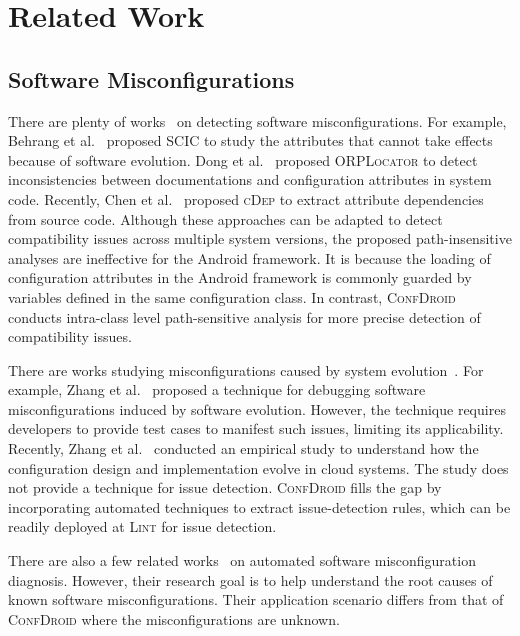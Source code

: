 \section{Related Work}

\subsection{Software Misconfigurations}
There are plenty of works~\cite{rabkin2011static, xu2013not
,behrang2015users,xu2016early, dong2016orplocator, chen2020understanding,
toman2016staccato} on detecting software misconfigurations.
For example,
Behrang et al.~\cite{behrang2015users} proposed  \textsc{SCIC} to study the attributes that cannot take effects because of software evolution.
Dong et al.~\cite{dong2016orplocator} proposed \textsc{ORPLocator} to detect
inconsistencies between documentations and configuration attributes in system
code.
Recently, Chen et al.~\cite{chen2020understanding} proposed
\textsc{cDep} to extract attribute dependencies from source code.
Although these approaches can be adapted to detect compatibility issues
across multiple system versions, the proposed path-insensitive analyses are ineffective for the Android framework. It is because the loading of configuration attributes in the Android framework is commonly guarded
by variables defined in the same configuration class. In contrast,
\textsc{ConfDroid} conducts intra-class level path-sensitive analysis for
more precise detection of compatibility issues.

There are works studying misconfigurations caused by system evolution~\cite{zhang2014configuration, zhang2021evolutionary}.
For example, Zhang et al.~\cite{zhang2014configuration} proposed a technique for debugging software misconfigurations induced by software evolution.
However, the technique requires developers to provide test cases to manifest
such issues, limiting its applicability.
Recently, Zhang et al.~\cite{zhang2021evolutionary} conducted an empirical study to understand how the configuration design and implementation evolve in cloud systems.
The study does not provide a technique for issue detection.
\textsc{ConfDroid} fills the gap by incorporating automated techniques to
extract issue-detection rules, which can be readily deployed at \textsc{Lint}
for issue detection.

There are also a few related works~\cite{attariyan2012x,
rabkin2011precomputing, zhang2013automated, zhang2015proactive } on automated
software misconfiguration diagnosis.
However, their research goal is to help understand the root causes of known
software misconfigurations. Their application scenario differs from
that of \textsc{ConfDroid} where the misconfigurations are unknown.


